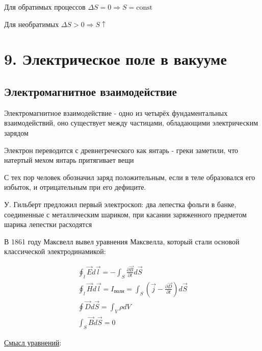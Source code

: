 \documentclass[12pt]{article}
\begin{document}
    Для обратимых процессов $\Delta S = 0 \Longrightarrow S = \mathrm{const}$

    Для необратимых $\Delta S > 0 \Longrightarrow S \uparrow$

    


    \section{9. Электрическое поле в вакууме}

    \subsection{Электромагнитное взаимодействие}

    Электромагнитное взаимодействие - одно из четырёх фундаментальных взаимодействий, 
    оно существует между частицами, обладающими электрическим зарядом

    Электрон переводится с древнегреческого как янтарь - греки заметили, что натертый мехом янтарь притягивает вещи

    С тех пор человек обозначил заряд положительным, если в теле образовался его избыток, и отрицательным при его дефиците.

    У. Гильберт предложил первый электроскоп: два лепестка фольги в банке, соединенные с металлическим шариком,
    при касании заряженного предметом шарика лепестки расходятся

    В 1861 году Максвелл вывел уравнения Максвелла, который стали основой классической электродинамикой:

    \begin{tcolorbox}[title=Уравнения Максвелла, colframe=green!25, colback=green!10, coltitle=black]
        \begin{gather*}
            \oint_l \vec{E} d\vec{l} = -\int_S \frac{\partial \vec{B}}{\partial t} d\vec{S}\\
            \oint_l \vec{H} d\vec{l} = I_{\text{полн}} = \int_S (\vec{j} - \frac{\partial \vec{D}}{\partial t}) d\vec{S}\\
            \oint \vec{D} d\vec{S} = \int_V \rho dV\\
            \int_S \vec{B} d\vec{S} = 0
        \end{gather*}
    \end{tcolorbox}

    \underline{Смысл уравнений}:
\end{document}
